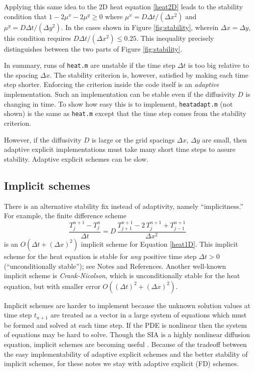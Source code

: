 \documentclass[letterpaper,final,12pt,reqno]{amsart}
\begin{document}
Applying this same idea to the 2D heat equation \eqref{heat2D} leads to the stability condition that $1-2\mu^x-2\mu^y \ge 0$ where $\mu^x = D \Delta t / (\Delta x^2)$ and $\mu^y = D \Delta t / (\Delta y^2)$.  In the cases shown in Figure \ref{fig:stability}, wherein $\Delta x=\Delta y$, this condition requires $D \Delta t /(\Delta x^2) \le 0.25$.  This inequality precisely distinguishes between the two parts of Figure \ref{fig:stability}.

In summary, runs of \texttt{heat.m} are unstable if the time step $\Delta t$ is too big relative to the spacing $\Delta x$.  The stability criterion is, however, satisfied by making each time step shorter.  Enforcing the criterion inside the code itself is an \emph{adaptive} implementation.  Such an implementation can be stable even if the diffusivity $D$ is changing in time.  To show how easy this is to implement, \texttt{heatadapt.m} (not shown) is the same as \texttt{heat.m} except that the time step comes from the stability criterion.

However, if the diffusivity $D$ is large or the grid spacings $\Delta x$, $\Delta y$ are small, then adaptive explicit implementations must take many short time steps to assure stability.  Adaptive explicit schemes can be slow.

\subsection*{Implicit schemes}  There is an alternative stability fix instead of adaptivity, namely ``implicitness.''  For example, the finite difference scheme
\begin{equation}
  \frac{T_j^{n+1} - T_j^n}{\Delta t} = D\,\frac{T_{j+1}^{n+1} - 2\, T_j^{n+1} + T_{j-1}^{n+1}}{\Delta x^2} \label{implicit1D}
\end{equation}
is an $O(\Delta t + (\Delta x)^2)$ implicit scheme for Equation \eqref{heat1D}.  This implicit scheme for the heat equation is stable for \emph{any} positive time step $\Delta t>0$ (``unconditionally stable''); see Notes and References.  Another well-known implicit scheme is \emph{Crank-Nicolson}, which is unconditionally stable for the heat equation, but with smaller error $O((\Delta t)^2 +(\Delta x)^2)$.

Implicit schemes are harder to implement because the unknown solution values at time step $t_{n+1}$ are treated as a vector in a large system of equations which must be formed and solved at each time step.  If the PDE is nonlinear then the system of equations may be hard to solve.  Though the SIA is a highly nonlinear diffusion equation, implicit schemes are becoming useful \cite{Bueler2016}.  Because of the tradeoff between the easy implementability of adaptive explicit schemes and the better stability of implicit schemes, for these notes we stay with adaptive explicit (FD) schemes.
\end{document}
